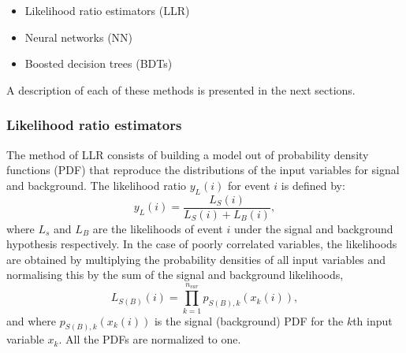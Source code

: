 \begin{itemize}\addtolength{\itemsep}{-0.4\baselineskip}
\item
Likelihood ratio estimators (LLR)
\item
Neural networks (NN)
\item
Boosted decision trees (BDTs)
\end{itemize}

A description of each of these methods is presented in the next sections.

\subsubsection{Likelihood ratio estimators}

The method of LLR consists of building a model out of probability density functions (PDF) that reproduce the distributions of the input variables for signal and background. 
The likelihood ratio $y_{L}(i)$ for event $i$ is defined by:
%
\begin{equation}
y_{L}(i) = \frac{L_S(i)}{L_S(i)+L_B(i)},
\end{equation}
%
where $L_s$ and $L_B$ are the likelihoods of event $i$ under the signal and background hypothesis respectively.
In the case of poorly correlated variables, the likelihoods  %
are obtained by multiplying the probability densities of all input variables and normalising this by the sum of the signal and background likelihoods, %
%
\begin{equation}
L_{S(B)}(i) = \prod^{n_{var}}_{k=1}  p_{S(B),k}(x_k(i)),
\end{equation}
%
and where $p_{S(B),k}(x_k(i))$ is the signal (background) PDF for the $k$th input variable $x_k$. All the PDFs are normalized to one. 

